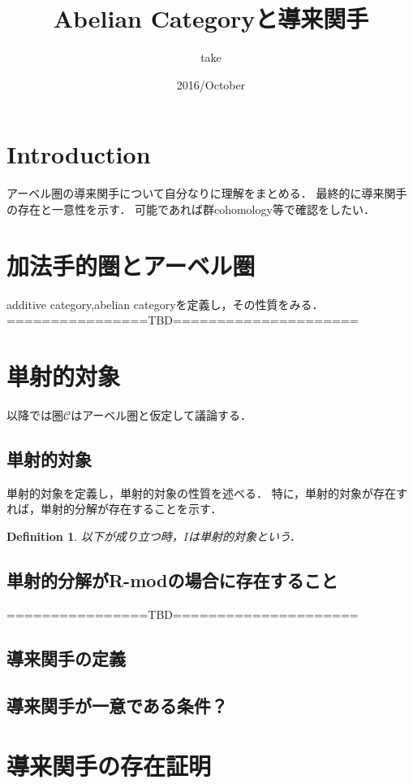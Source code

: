 \documentclass{ujarticle}
\title{Abelian Categoryと導来関手}
\author{take}
\date{2016/October}
\newtheorem{dfn}[thm]{Definition}
\begin{document}
  \tableofcontents
\section{Introduction}
\label{sec:Introduction}


アーベル圏の導来関手について自分なりに理解をまとめる．
最終的に導来関手の存在と一意性を示す．
可能であれば群cohomology等で確認をしたい．
  \section{加法手的圏とアーベル圏}
  \label{sec:加法手的圏とアーベル圏}
  additive category,abelian categoryを定義し，その性質をみる．
  ================TBD=====================

  \section{単射的対象}
  \label{sec:単射的対象}
  以降では圏$\mathcal{C}$はアーベル圏と仮定して議論する．
  \subsection{ 単射的対象 }
  単射的対象を定義し，単射的対象の性質を述べる．
  特に，単射的対象が存在すれば，単射的分解が存在することを示す．
  \begin{dfn}
   以下が成り立つ時，$I$は単射的対象という．
  \end{dfn}

  \subsection{ 単射的分解がR-modの場合に存在すること }
  ================TBD=====================

  \subsection{ 導来関手の定義 }


  \subsection{ 導来関手が一意である条件？ }


  \section{ 導来関手の存在証明 }
\end{document}
